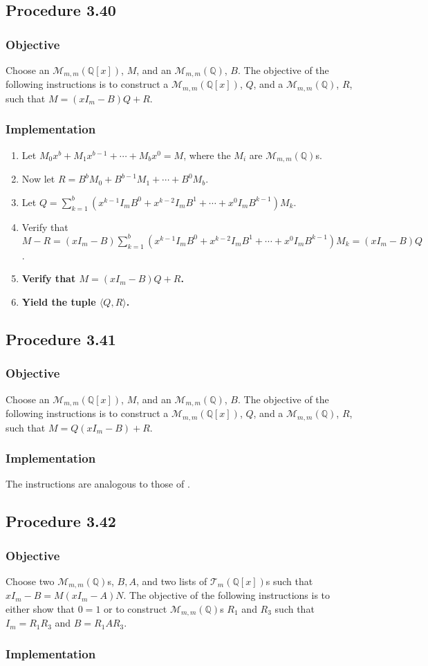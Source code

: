 \documentclass[twocolumn]{article}
\newcommand{\procedure}[2][]{\subsection*{Procedure #2 \ifthenelse{\equal{#1}{}}{}{(#1)}}\label{sec:procedure #2}}
\newcommand{\objective}{\subsubsection*{Objective}}
\newcommand{\implementation}{\subsubsection*{Implementation}}
\newcommand{\procedurehr}[2][]{\hyperref[sec:procedure #2]{\ifthenelse{\equal{#1}{}}{procedure #2}{#1}}}
\begin{document}
		\procedure{3.40}
			\objective
				Choose an $\mathcal{M}_{m,m}(\mathbb{Q}[x])$, $M$, and an $\mathcal{M}_{m,m}(\mathbb{Q})$, $B$. The objective of the following instructions is to construct a $\mathcal{M}_{m,m}(\mathbb{Q}[x])$, $Q$, and a $\mathcal{M}_{m,m}(\mathbb{Q})$, $R$, such that $M=(xI_m-B)Q+R$.
			\implementation
				\begin{enumerate}
					\item Let $M_0x^b+M_1x^{b-1}+\cdots+M_bx^0=M$, where the $M_i$ are $\mathcal{M}_{m,m}(\mathbb{Q})$s.
					\item Now let $R=B^bM_0+B^{b-1}M_1+\cdots+B^0M_b$.
					\item Let $Q=\sum_{k=1}^b (x^{k-1}I_mB^0+x^{k-2}I_mB^1+\cdots+x^0I_mB^{k-1})M_k$.
					\item Verify that $M-R=(xI_m-B)\sum_{k=1}^b (x^{k-1}I_mB^0+x^{k-2}I_mB^1+\cdots+x^0I_mB^{k-1})M_k=(xI_m-B)Q$.
					\item \textbf{Verify that $M=(xI_m-B)Q+R$.}
					\item \textbf{Yield the tuple $\langle Q,R\rangle$.}
				\end{enumerate}
		\procedure{3.41}
			\objective
				Choose an $\mathcal{M}_{m,m}(\mathbb{Q}[x])$, $M$, and an $\mathcal{M}_{m,m}(\mathbb{Q})$, $B$. The objective of the following instructions is to construct a $\mathcal{M}_{m,m}(\mathbb{Q}[x])$, $Q$, and a $\mathcal{M}_{m,m}(\mathbb{Q})$, $R$, such that $M=Q(xI_m-B)+R$.
			\implementation
				The instructions are analogous to those of \procedurehr{3.40}.
		\procedure{3.42}
			\objective
				Choose two $\mathcal{M}_{m,m}(\mathbb{Q})$s, $B,A$, and two lists of $\mathcal{T}_{m}(\mathbb{Q}[x])$s such that $xI_m-B=M(xI_m-A)N$. The objective of the following instructions is to either show that $0=1$ or to construct $\mathcal{M}_{m,m}(\mathbb{Q})$s $R_1$ and $R_3$ such that $I_m=R_1R_3$ and $B=R_1AR_3$.
			\implementation
\end{document}
